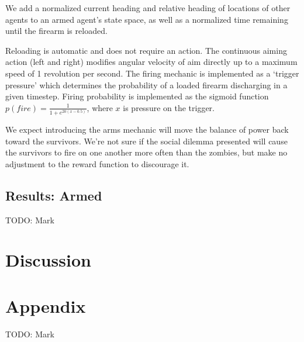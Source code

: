 \documentclass[11pt,a4paper]{article}
\begin{document}
We add a normalized current heading and relative heading of locations of other agents to an armed agent's state space, as well as a normalized time remaining until the firearm is reloaded.

Reloading is automatic and does not require an action.
The continuous aiming action (left and right) modifies angular velocity of aim directly up to a maximum speed of 1 revolution per second.
The firing mechanic is implemented as a `trigger pressure' which determines the probability of a loaded firearm discharging in a given timestep.
Firing probability is implemented as the sigmoid function $p(fire) = \frac{1}{1+e^{20(x-0.5)}}$, where $x$ is pressure on the trigger.

We expect introducing the arms mechanic will move the balance of power back toward the survivors.
We're not sure if the social dilemma presented will cause the survivors to fire on one another more often than the zombies,
but make no adjustment to the reward function to discourage it.

\subsection{Results: Armed}

TODO: Mark

\section{Discussion}
\label{sec:discussion}




\appendix
\section{Appendix}
\label{sec:appendix}

TODO: Mark
\end{document}
